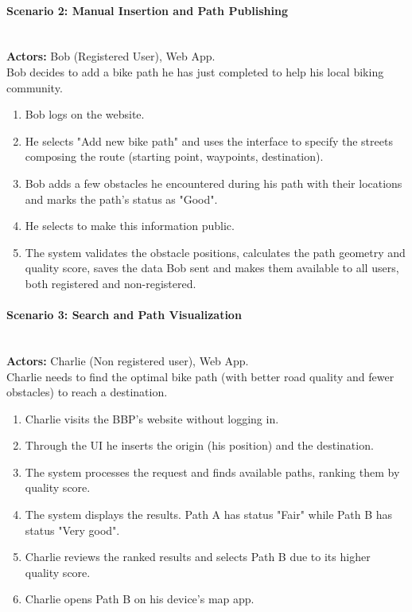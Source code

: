 \paragraph{Scenario 2: Manual Insertion and Path Publishing}\mbox{}\\
\textbf{Actors:} Bob (Registered User), Web App.\\
Bob decides to add a bike path he has just completed to help his local biking community.
\begin{enumerate}
    \item Bob logs on the website.
    \item He selects "Add new bike path" and uses the interface to specify the streets composing the route (starting point, waypoints, destination).
    \item Bob adds a few obstacles he encountered during his path with their locations and marks the path's status as "Good".
    \item He selects to make this information public.
    \item The system validates the obstacle positions, calculates the path geometry and quality score, saves the data Bob sent and makes them available to all users, both registered and non-registered.
\end{enumerate}

\paragraph{Scenario 3: Search and Path Visualization}\mbox{}\\
\textbf{Actors:} Charlie (Non registered user), Web App.\\
Charlie needs to find the optimal bike path (with better road quality and fewer obstacles) to reach a destination.
\begin{enumerate}
    \item Charlie visits the BBP's website without logging in.
    \item Through the UI he inserts the origin (his position) and the destination.
    \item The system processes the request and finds available paths, ranking them by quality score.
    \item The system displays the results. Path A has status "Fair" while Path B has status "Very good".
    \item Charlie reviews the ranked results and selects Path B due to its higher quality score.
    \item Charlie opens Path B on his device's map app.
\end{enumerate}

